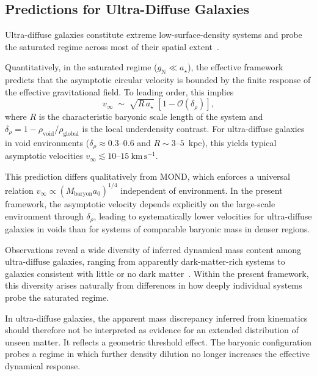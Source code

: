 \subsection{Predictions for Ultra-Diffuse Galaxies}
  \label{subsec:udg}

  Ultra-diffuse galaxies constitute extreme low-surface-density systems and
  probe the saturated regime across most of their spatial
  extent~\cite{vanDokkum2016UDG}.

  Quantitatively, in the saturated regime ($g_{\mathrm{N}} \ll a_\star$), the
  effective framework predicts that the asymptotic circular velocity is bounded
  by the finite response of the effective gravitational field.
  To leading order, this implies
  \begin{equation}
    v_{\infty}
    \;\sim\;
    \sqrt{R\, a_\star}\;
    \left[
      1
      -
      \mathcal{O}\!\left(\delta_\rho\right)
    \right] ,
    \label{eq:udg-velocity}
  \end{equation}
  where $R$ is the characteristic baryonic scale length of the system and
  $\delta_\rho = 1 - \rho_{\mathrm{void}}/\rho_{\mathrm{global}}$ is the local
  underdensity contrast.
  For ultra-diffuse galaxies in void environments
  ($\delta_\rho \approx 0.3$--$0.6$ and $R \sim 3$--$5$~kpc),
  this yields typical asymptotic velocities
  $v_{\infty} \lesssim 10$--$15~\mathrm{km\,s^{-1}}$.

  This prediction differs qualitatively from MOND, which enforces a universal
  relation $v_{\infty} \propto (M_{\mathrm{baryon}} a_0)^{1/4}$ independent of
  environment.
  In the present framework, the asymptotic velocity depends explicitly on the
  large-scale environment through $\delta_\rho$, leading to systematically lower
  velocities for ultra-diffuse galaxies in voids than for systems of comparable
  baryonic mass in denser regions.

  Observations reveal a wide diversity of inferred dynamical mass content among
  ultra-diffuse galaxies, ranging from apparently dark-matter-rich systems to
  galaxies consistent with little or no dark
  matter~\cite{vanDokkum2019DF2,ManceraPina2019UDG}.
  Within the present framework, this diversity arises naturally from differences
  in how deeply individual systems probe the saturated regime.

  In ultra-diffuse galaxies, the apparent mass discrepancy inferred from
  kinematics should therefore not be interpreted as evidence for an extended
  distribution of unseen matter.
  It reflects a geometric threshold effect.
  The baryonic configuration probes a regime in which further density dilution no
  longer increases the effective dynamical response.

